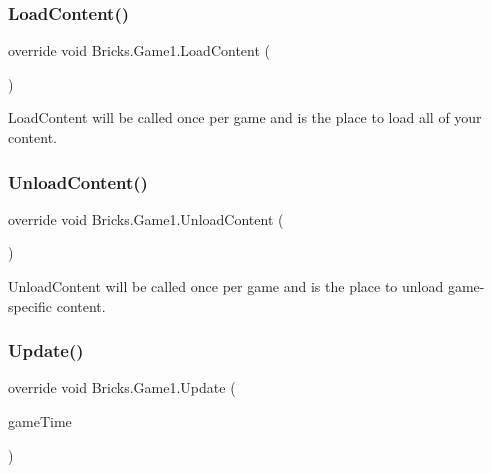 \mbox{\label{class_bricks_1_1_game1_a9477f2c0d6b25580572ea60b1667bf51}} 
\subsubsection{\texorpdfstring{LoadContent()}{LoadContent()}}
{\footnotesize\ttfamily override void Bricks.\+Game1.\+Load\+Content (\begin{DoxyParamCaption}{ }\end{DoxyParamCaption})\hspace{0.3cm}{\ttfamily [protected]}}



Load\+Content will be called once per game and is the place to load all of your content. 

\mbox{\label{class_bricks_1_1_game1_a2e29aefa35f702ee9a203571195b2ab4}} 
\subsubsection{\texorpdfstring{UnloadContent()}{UnloadContent()}}
{\footnotesize\ttfamily override void Bricks.\+Game1.\+Unload\+Content (\begin{DoxyParamCaption}{ }\end{DoxyParamCaption})\hspace{0.3cm}{\ttfamily [protected]}}



Unload\+Content will be called once per game and is the place to unload game-\/specific content. 

\mbox{\label{class_bricks_1_1_game1_a0bfa1c36793d89b0c95098a17f195697}} 
\subsubsection{\texorpdfstring{Update()}{Update()}}
{\footnotesize\ttfamily override void Bricks.\+Game1.\+Update (\begin{DoxyParamCaption}\item[{Game\+Time}]{game\+Time }\end{DoxyParamCaption})\hspace{0.3cm}{\ttfamily [protected]}}



